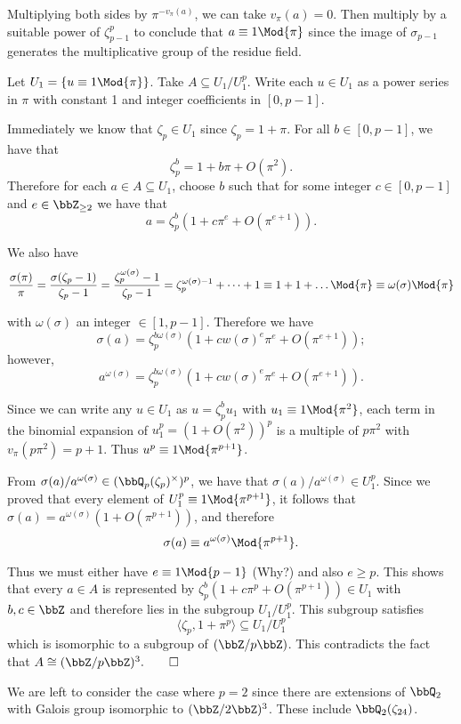\documentclass[a4paper, 12pt,oneside,openany]{book}
\begin{document}
Multiplying both sides by $\pi^{-v_\pi(a)}$, we can take $v_\pi(a)=0$. Then multiply by a suitable power of $\zeta_{p-1}^p$ to conclude that $a \equiv 1 \Mod{\pi}$ since the image of $\sigma_{p-1}$ generates the multiplicative group of the residue field.

Let $U_1 = \{u \equiv 1 \Mod{\pi}\}$. Take $A \subseteq U_1/U_1^p$. Write each $u \in U_1$ as a power series in $\pi$ with constant 1 and integer coefficients in $[0, p-1]$. 

Immediately we know that $\zeta_p \in U_1$ since $\zeta_p = 1+\pi$. For all $b \in [0, p-1]$, we have that $$\zeta_p^b = 1+b\pi+O(\pi^2).$$ Therefore for each $a \in A \subseteq U_1$, choose $b$ such that for some integer $c \in [0, p-1]$ and $e \in \bbZ_{\geq 2}$ we have that $$a = \zeta_p^b (1+c\pi^e + O(\pi^{e+1})).$$

We also have $$\frac{\sigma(\pi)}{\pi} = \frac{\sigma(\zeta_p -1)}{\zeta_p -1}= \frac{\zeta_p^{\omega(\sigma)} -1}{\zeta_p -1} = \zeta_p^{\omega(\sigma)-1}+\dots+1 \equiv 1+1+\dots \Mod{\pi} \equiv \omega(\sigma) \Mod{\pi}$$ 

with $\omega(\sigma)$ an integer $\in [1, p-1]$. Therefore we have $$\sigma(a) = \zeta_p^{b\omega(\sigma)}(1+cw(\sigma)^e\pi^e + O(\pi^{e+1}));$$ however,  $$a^{\omega(\sigma)} = \zeta_p^{b\omega(\sigma)}(1+cw(\sigma)^e\pi^e + O(\pi^{e+1})).$$

Since we can write any $u \in U_1$ as $u = \zeta_p^b u_1$ with $u_1 \equiv 1\Mod{\pi^2}$, each term in the binomial expansion of $u_1^p = (1+O(\pi^2))^p$ is a multiple of $p\pi^2$ with $v_\pi(p \pi^2) = p+1.$ Thus $u^p \equiv 1\Mod{\pi^{p+1}}$.

From $\sigma(a)/a^{\omega(\sigma)} \in (\bbQ_p(\zeta_p)^\times)^p$, we have that $\sigma(a) / a^{\omega(\sigma)} \in U_1^p$. Since we proved that every element of $U_1^p \equiv 1 \Mod{\pi^{p+1}}$, it follows that $\sigma(a) = a^{\omega(\sigma)} (1+O(\pi^{p+1}))$, and therefore $$\sigma(a) \equiv a^{\omega(\sigma)}  \Mod{\pi^{p+1}}.$$

Thus we must either have $e \equiv 1 \Mod{p-1}$ (Why?) and also $e \geq p$. This shows that every $a \in A$ is represented by $\zeta_p^b (1+c\pi^p + O(\pi^{p+1})) \in U_1$ with $b, c\in \bbZ$ and therefore lies in the subgroup $U_1/U_1^p$. This subgroup satisfies $$\langle \zeta_p, 1+\pi^p \rangle \subseteq U_1/ U_1^p$$ which is isomorphic to a subgroup of $(\bbZ/p\bbZ)$. This contradicts the fact that $A \cong (\bbZ/p\bbZ)^3. \qed$

We are left to consider the case where $p=2$ since there are extensions of $\bbQ_2$ with Galois group isomorphic to $(\bbZ/2\bbZ)^3$. These include $\bbQ_2(\zeta_{24})$.
\end{document}
